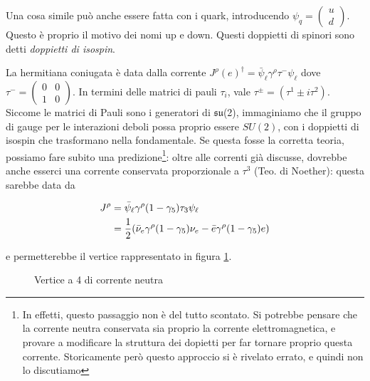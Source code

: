 \documentclass[11pt]{report}
\begin{document}
Una cosa simile può anche essere fatta con i quark, introducendo \(\psi_q = \begin{pmatrix}
    u \\ d 
\end{pmatrix}\). Questo è proprio il motivo dei nomi up e down. Questi doppietti di spinori sono detti \emph{doppietti di isospin}. 

La hermitiana coniugata è data dalla corrente \(J^\rho(e)^\dagger = \bar{\psi}_\ell \gamma^\rho \tau^- \psi_\ell\) dove \(\tau^- = \begin{pmatrix}
    0 & 0 \\
    1 & 0 
\end{pmatrix}\). In termini delle matrici di pauli \(\tau_i\), vale \(\tau^\pm = (\tau^1 \pm i \tau^2)\). Siccome le matrici di Pauli sono i generatori di \(\mathfrak{su}\)(2), immaginiamo che il gruppo di gauge per le interazioni deboli possa proprio essere \(SU(2)\), con i doppietti di isospin che trasformano nella fondamentale. Se questa fosse la corretta teoria, possiamo fare subito una predizione\footnote{In effetti, questo passaggio non è del tutto scontato. Si potrebbe pensare che la corrente neutra conservata sia proprio la corrente elettromagnetica, e provare a modificare la struttura dei dopietti per far tornare proprio questa corrente. Storicamente però questo approccio si è rivelato errato, e quindi non lo discutiamo}: oltre alle correnti già discusse, dovrebbe anche esserci una corrente conservata proporzionale a \(\tau^3\) (Teo. di Noether): questa sarebbe data da 

\begin{align}
    J^\rho &= \bar{\psi}_\ell \gamma^\rho (1-\gamma_5)\tau_3 \psi_\ell \notag \\
    &= \frac{1}{2}(\bar{\nu}_e \gamma^\rho (1-\gamma_5)\nu_e - \bar{e}\gamma^\rho (1-\gamma_5)e)
\end{align}

e permetterebbe il vertice rappresentato in figura \ref{fig:eenunu}. 

\begin{figure}
    \caption{Vertice a 4 di corrente neutra}
    \label{fig:eenunu}
    \begin{center}
    \end{center}
\end{figure}
\end{document}
